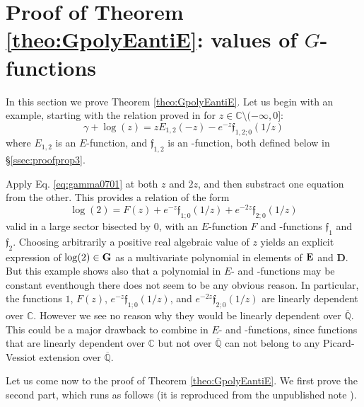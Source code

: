 \documentclass[reqno,12pt]{article}
\numberwithin{equation}{section}
\theoremstyle{remark}
\renewcommand{\C}{\mathbb{C}}
\newcommand{\Qbar}{\overline{\mathbb Q}}
\newcommand{\tantie}{\foreignlanguage{russian}{\CYREREV}}
\newcommand{\antie}{\text{\tantie}}
\newcommand{\GG}{{\bf G}}
\newcommand{\EE}{{\bf E}}
\newcommand{\fgo}{\mathfrak{f}}
\begin{document}
 




\section{Proof of Theorem \ref{theo:GpolyEantiE}: values of $G$-functions}\label{sec:proofthmpolyGEantiE}

In this section we prove Theorem \ref{theo:GpolyEantiE}. Let us begin with an example, starting with the relation proved in \cite[Proposition 1]{Michigan} for $z\in\C\setminus (-\infty,0]$: 
\begin{equation}\label{eq:gamma0701} 
    \gamma+\log(z)= z E_{1,2}(-z)-e^{-z} \fgo_{1,2;0}(1/z)
\end{equation}
where $E_{1,2}$ is an $E$-function,  and $\fgo_{1,2} $ is an \antie-function, both defined below in \S \ref{ssec:proofprop3}. 


Apply Eq. \eqref{eq:gamma0701} at both $z$ and $2z$, and then substract one equation from the other. This provides a relation of the form 
\begin{equation} \label{eq:log(2)EantiE}
\log(2) = F(z) + e^{-z}  \fgo_{1;0} ( 1/z) + e^{-2z}  \fgo_{2;0} ( 1/z) 
\end{equation}
valid in a large sector bisected by $0$, with an $E$-function $F$ and \antie-functions $\fgo_1$ and $\fgo_2$. Choosing arbitrarily a positive real algebraic value of $z $ yields an explicit expression of $\log(2)\in\GG$ as a multivariate polynomial in elements of $\EE$ and  {\bf D}. But this example shows also that a polynomial in $E$- and \antie-functions may be constant eventhough there does not seem to be any obvious reason. In particular, 
 the functions $1$, $F(z)$, $ e^{-z}  \fgo_{1;0} ( 1/z)$, and $ e^{-2z}  \fgo_{2;0}  ( 1/z) $ are linearly dependent over $\C$. However we see no reason why they would be linearly dependent over $\Qbar$. This could be a major drawback to combine in  $E$- and \antie-functions, since functions that are linearly dependent over $\C$ but not over $\Qbar$ can not belong to any Picard-Vessiot extension  over $\Qbar$.   

\bigskip

Let us come now to the proof of Theorem \ref{theo:GpolyEantiE}. We first prove the second part, which runs as follows (it is reproduced from the unpublished note \cite{rivoalnote}). 
\end{document}
